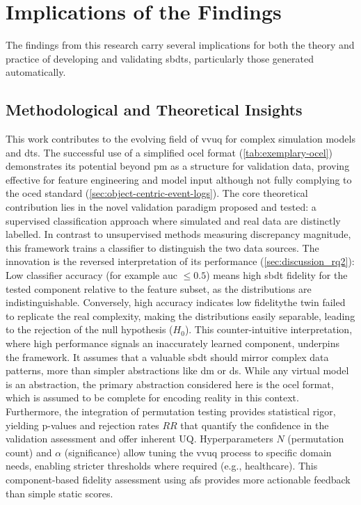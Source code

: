 \section{Implications of the Findings}
\label{sec:discussion_implications}

The findings from this research carry several implications for both the theory and practice of developing and validating \gls{sbdt}s, particularly those generated automatically.

\subsection{Methodological and Theoretical Insights}
\label{sec:implications_theoretical}

This work contributes to the evolving field of \gls{vvuq} for complex simulation models and \gls{dt}s. The successful use of a simplified \gls{ocel} format (\autoref{tab:exemplary-ocel}) demonstrates its potential beyond \gls{pm} as a structure for validation data, proving effective for feature engineering and model input although not fully complying to the \gls{oced} standard (\autoref{sec:object-centric-event-logs}). The core theoretical contribution lies in the novel validation paradigm proposed and tested: a supervised classification approach where simulated and real data are distinctly labelled. In contrast to unsupervised methods measuring discrepancy magnitude, this framework trains a classifier to distinguish the two data sources. The innovation is the reversed interpretation of its performance (\autoref{sec:discussion_rq2}): Low classifier accuracy (for example \gls{auc} $\le 0.5$) means high \gls{sbdt} fidelity for the tested component relative to the feature subset, as the distributions are indistinguishable. Conversely, high accuracy indicates low fidelity\textemdash the twin failed to replicate the real complexity, making the distributions easily separable, leading to the rejection of the null hypothesis ($H_0$). This counter-intuitive interpretation, where high performance signals an inaccurately learned component, underpins the framework. It assumes that a valuable \gls{sbdt} should mirror complex data patterns, more than simpler abstractions like \gls{dm} or \gls{ds}. While any virtual model is an abstraction, the primary abstraction considered here is the \gls{ocel} format, which is assumed to be complete for encoding reality in this context. Furthermore, the integration of permutation testing provides statistical rigor, yielding p-values and rejection rates $RR$ that quantify the confidence in the validation assessment and offer inherent UQ. Hyperparameters $N$ (permutation count) and $\alpha$ (significance) allow tuning the \gls{vvuq} process to specific domain needs, enabling stricter thresholds where required (e.g., healthcare). This component-based fidelity assessment using \gls{afs} provides more actionable feedback than simple static scores.

